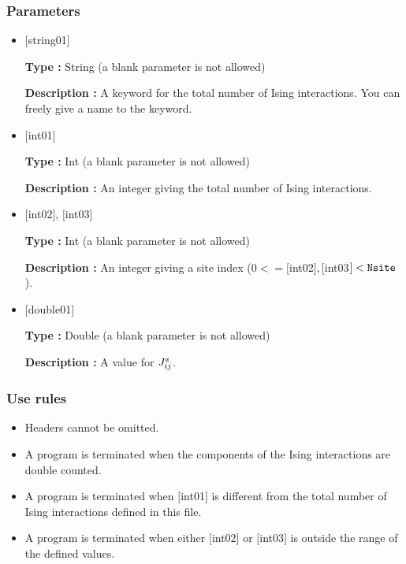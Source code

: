 \subsubsection{Parameters}
 \begin{itemize}

   \item  $[$string01$]$
   
    {\bf Type :} String (a blank parameter is not allowed)

   {\bf Description :}  A keyword for the total number of Ising interactions. You can freely give a name to the keyword.

   \item  $[$int01$]$
   
    {\bf Type :} Int (a blank parameter is not allowed)

   {\bf Description :} An integer giving the total number of Ising interactions.

  \item  $[$int02$]$, $[$int03$]$
  
 {\bf Type :} Int (a blank parameter is not allowed)

{\bf Description :} An integer giving a site index ($0<= [$int02$], [$int03$]<\verb|Nsite|$).
 
 \item  $[$double01$]$
   
   {\bf Type :} Double (a blank parameter is not allowed)

  {\bf Description :}   A value for $J_{ij}^{\rm z}$.
  
\end{itemize}

\subsubsection{Use rules}
\begin{itemize}
\item Headers cannot be omitted. 
\item A program is terminated when the components of the Ising interactions are double counted.
\item A program is terminated when $[$int01$]$ is different from the total number of Ising interactions defined in this file.
\item A program is terminated when either $[$int02$]$ or $[$int03$]$ is outside the range of the defined values.
\end{itemize}


\newpage
